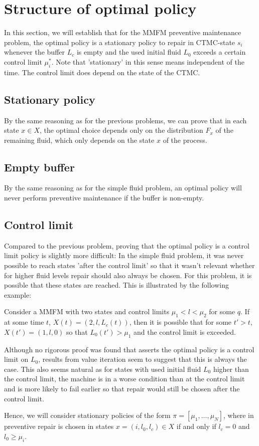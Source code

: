 \section{Structure of optimal policy}
In this section, we will establish that for the MMFM preventive maintenance problem, the optimal policy is a stationary policy to repair in CTMC-state $s_i$ whenever the buffer $L_c$ is empty and the used initial fluid $L_0$ exceeds a certain control limit $\mu_i^*$.
Note that 'stationary' in this sense means independent of the time. 
The control limit does depend on the state of the CTMC.

\subsection{Stationary policy}
By the same reasoning as for the previous problems, we can prove that in each state $x\in X$, the optimal choice depends only on the distribution $F_x$ of the remaining fluid, which only depends on the state $x$ of the process.

\subsection{Empty buffer}
By the same reasoning as for the simple fluid problem, an optimal policy will never perform preventive maintenance if the buffer is non-empty.

\subsection{Control limit}
Compared to the previous problem, proving that the optimal policy is a control limit policy is slightly more difficult:
In the simple fluid problem, it was never possible to reach states 'after the control limit' so that it wasn't relevant whether for higher fluid levels repair should also always be chosen.
For this problem, it is possible that these states are reached.
This is illustrated by the following example:
\begin{example}
	Consider a MMFM with two states and control limits $\mu_1<l<\mu_2$ for some $q$.
	If at some time $t$, $X(t)=(2,l,L_c(t))$, then it is possible that for some $t'>t$, $X(t')=(1,l,0)$ so that $L_0(t')>\mu_1$ and the control limit is exceeded.
\end{example}
Although no rigorous proof was found that asserts the optimal policy is a control limit on $L_0$, results from value iteration seem to suggest that this is always the case.
This also seems natural as for states with used initial fluid $L_0$ higher than the control limit, the machine is in a worse condition than at the control limit and is more likely to fail earlier so that repair would still be chosen after the control limit.

Hence, we will consider stationary policies of the form $\pi=[\mu_1,...,\mu_N]$, where in preventive repair is chosen in states $x=(i,l_0,l_c)\in X$ if and only if $l_c=0$ and $l_0\geq \mu_i$.